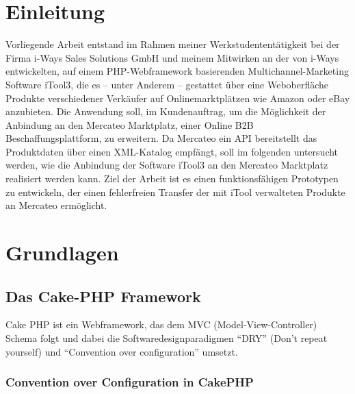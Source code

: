 

\clearpage
\section{Einleitung}
\vspace*{\fill}
\begin{center}
\begin{minipage}{.6\textwidth}

Vorliegende Arbeit entstand im Rahmen meiner Werkstudententätigkeit bei der Firma i-Ways Sales Solutions GmbH und meinem Mitwirken
an der von i-Ways entwickelten, auf einem PHP-Webframework basierenden Multichannel-Marketing Software iTool3, die es -- unter Anderem -- gestattet über eine Weboberfläche Produkte verschiedener
Verkäufer auf Onlinemarktplätzen wie Amazon oder eBay anzubieten.
Die Anwendung soll, im Kundenauftrag, um die Möglichkeit der Anbindung an den Mercateo Marktplatz, einer Online B2B Beschaffungsplattform, zu erweitern.
Da Mercateo ein API bereitstellt das Produktdaten über einen XML-Katalog empfängt, soll im folgenden untersucht werden, wie die Anbindung der Software iTool3 an den Mercateo Marktplatz realisiert werden kann. Ziel der Arbeit ist es einen funktionsfähigen Prototypen zu entwickeln, der einen fehlerfreien Transfer der mit iTool verwalteten Produkte an Mercateo ermöglicht.
\end{minipage}
\end{center}
\vfill %
\clearpage

\pagebreak

\section{Grundlagen}

\subsection{Das Cake-PHP Framework}
	
	Cake PHP ist ein Webframework, das dem MVC (Model-View-Controller) Schema folgt und dabei die Softwaredesignparadigmen \enquote{DRY} (Don't repeat yourself) und \enquote{Convention over configuration} umsetzt. 
	
	\subsubsection{Convention over Configuration in CakePHP}
	
